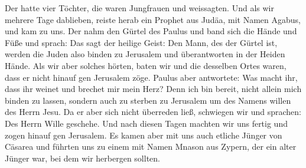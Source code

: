  Der hatte vier Töchter, die waren Jungfrauen und
weissagten.  Und als wir mehrere Tage dablieben, reiste
herab ein Prophet aus Judäa, mit Namen Agabus, und kam zu uns.
 Der nahm den Gürtel des Paulus und band sich die Hände
und Füße und sprach: Das sagt der heilige Geist: Den Mann, des der
Gürtel ist, werden die Juden also binden zu Jerusalem und überantworten
in der Heiden Hände.  Als wir aber solches hörten, baten
wir und die desselben Ortes waren, dass er nicht hinauf gen Jerusalem
zöge.  Paulus aber antwortete: Was macht ihr, dass ihr
weinet und brechet mir mein Herz? Denn ich bin bereit, nicht allein mich
binden zu lassen, sondern auch zu sterben zu Jerusalem um des Namens
willen des Herrn Jesu.  Da er aber sich nicht überreden
ließ, schwiegen wir und sprachen: Des Herrn Wille geschehe.
 Und nach diesen Tagen machten wir uns fertig und zogen
hinauf gen Jerusalem.  Es kamen aber mit uns auch etliche
Jünger von Cäsarea und führten uns zu einem mit Namen Mnason aus Zypern,
der ein alter Jünger war, bei dem wir herbergen sollten.


